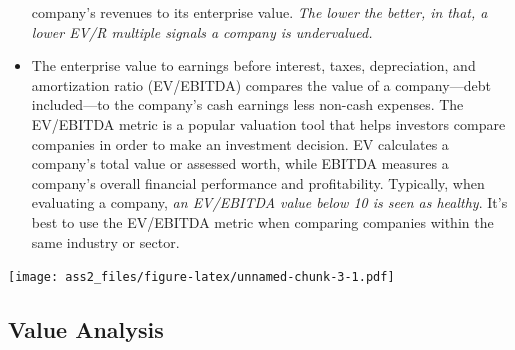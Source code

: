 \documentclass[
]{article}
\newenvironment{Shaded}{\begin{snugshade}}{\end{snugshade}}
\newcommand{\DataTypeTok}[1]{\textcolor[rgb]{0.13,0.29,0.53}{#1}}
\newcommand{\DecValTok}[1]{\textcolor[rgb]{0.00,0.00,0.81}{#1}}
\newcommand{\FloatTok}[1]{\textcolor[rgb]{0.00,0.00,0.81}{#1}}
\newcommand{\KeywordTok}[1]{\textcolor[rgb]{0.13,0.29,0.53}{\textbf{#1}}}
\newcommand{\NormalTok}[1]{#1}
\newcommand{\OperatorTok}[1]{\textcolor[rgb]{0.81,0.36,0.00}{\textbf{#1}}}
\newcommand{\OtherTok}[1]{\textcolor[rgb]{0.56,0.35,0.01}{#1}}
\newcommand{\StringTok}[1]{\textcolor[rgb]{0.31,0.60,0.02}{#1}}
\begin{document}
\begin{itemize}
  company's revenues to its enterprise value. \emph{The lower the
  better, in that, a lower EV/R multiple signals a company is
  undervalued.}
\item
  The enterprise value to earnings before interest, taxes, depreciation,
  and amortization ratio (EV/EBITDA) compares the value of a
  company---debt included---to the company's cash earnings less non-cash
  expenses. The EV/EBITDA metric is a popular valuation tool that helps
  investors compare companies in order to make an investment decision.
  EV calculates a company's total value or assessed worth, while EBITDA
  measures a company's overall financial performance and profitability.
  Typically, when evaluating a company, \emph{an EV/EBITDA value below
  10 is seen as healthy}. It's best to use the EV/EBITDA metric when
  comparing companies within the same industry or sector.
\end{itemize}

\begin{Shaded}
\end{Shaded}

\texttt{[image: ass2\_files/figure-latex/unnamed-chunk-3-1.pdf]}

\hypertarget{value-analysis}{%
\subsection{Value Analysis}\label{value-analysis}}

\begin{Shaded}
\end{Shaded}
\end{document}
